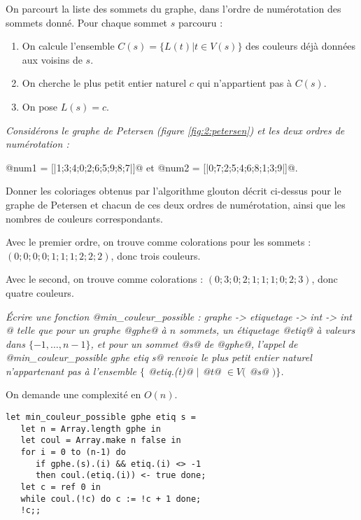 On parcourt la liste des sommets du graphe, dans l'ordre de numérotation des sommets donné. Pour chaque sommet $s$ parcouru : 
\begin{enumerate}
    \item On calcule l'ensemble $C(s) = \{ L(t) | t \in V(s) \}$ des couleurs déjà données aux voisins de $s$. 
    \item On cherche le plus petit entier naturel $c$ qui n'appartient pas à $C(s)$. 
    \item On pose $L(s) = c$.
\end{enumerate} 
\begin{Exercise}\it 
 Considérons le graphe de Petersen (figure \ref{fig:2:petersen}) et les deux ordres de numérotation :
 
@num1 = [|1;3;4;0;2;6;5;9;8;7|]@ et @num2 = [|0;7;2;5;4;6;8;1;3;9|]@. 

Donner les coloriages obtenus par l'algorithme glouton décrit ci-dessus pour le graphe de Petersen et chacun de ces deux ordres de numérotation, ainsi que les nombres de couleurs correspondants. 
\end{Exercise}  
\begin{Answer}
Avec le premier ordre, on trouve comme colorations pour les sommets : $(0;0;0;0;1;1;1;2;2;2)$, donc trois couleurs. 

Avec le second, on trouve comme colorations : $(0;3;0;2;1;1;1;0;2;3)$, donc quatre couleurs.
\end{Answer}
\begin{Exercise}\it 
Écrire une fonction  @min_couleur_possible : graphe -> etiquetage -> int -> int @ telle que pour un graphe @gphe@ à $n$ sommets, un étiquetage @etiq@ à valeurs dans $\{-1,\dots,n-1\}$, et pour un sommet @s@ de @gphe@, l'appel de @min_couleur_possible gphe etiq s@ renvoie le plus petit entier naturel n'appartenant pas à l'ensemble $\{$ @etiq.(t)@ $|$ @t@ $ \in V($ @s@ $) \}$. 

On demande une complexité en $O(n)$. 
\end{Exercise}  
\begin{Answer}
\begin{lstlisting}
let min_couleur_possible gphe etiq s =
   let n = Array.length gphe in
   let coul = Array.make n false in
   for i = 0 to (n-1) do
      if gphe.(s).(i) && etiq.(i) <> -1
      then coul.(etiq.(i)) <- true done;
   let c = ref 0 in
   while coul.(!c) do c := !c + 1 done;
   !c;;
\end{lstlisting}
\end{Answer}
